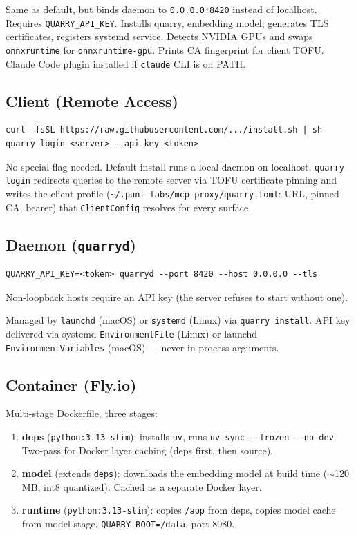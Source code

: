 \documentclass[a4paper,10pt]{article}
\begin{document}
Same as default, but binds daemon to \texttt{0.0.0.0:8420} instead of
localhost.  Requires \texttt{QUARRY\_API\_KEY}.  Installs quarry,
embedding model, generates TLS certificates, registers systemd service.
Detects NVIDIA GPUs and swaps \texttt{onnxruntime} for
\texttt{onnxruntime-gpu}.  Prints CA fingerprint for client TOFU.
Claude Code plugin installed if \texttt{claude} CLI is on PATH.

\subsection{Client (Remote Access)}

\begin{lstlisting}
curl -fsSL https://raw.githubusercontent.com/.../install.sh | sh
quarry login <server> --api-key <token>
\end{lstlisting}

No special flag needed.  Default install runs a local daemon on
localhost.  \texttt{quarry login} redirects queries to the remote
server via TOFU certificate pinning and writes the client profile
(\texttt{\~{}/.punt-labs/mcp-proxy/quarry.toml}: URL, pinned CA, bearer)
that \texttt{ClientConfig} resolves for every surface.

\subsection{Daemon (\texttt{quarryd})}

\begin{lstlisting}
QUARRY_API_KEY=<token> quarryd --port 8420 --host 0.0.0.0 --tls
\end{lstlisting}

Non-loopback hosts require an API key (the server refuses to start
without one).

Managed by \texttt{launchd} (macOS) or \texttt{systemd} (Linux) via
\texttt{quarry install}.  API key delivered via systemd
\texttt{EnvironmentFile} (Linux) or launchd
\texttt{EnvironmentVariables} (macOS) --- never in process arguments.

\subsection{Container (Fly.io)}

Multi-stage Dockerfile, three stages:

\begin{enumerate}
  \item \textbf{deps} (\texttt{python:3.13-slim}): installs
    \texttt{uv}, runs \texttt{uv sync -{}-frozen -{}-no-dev}.  Two-pass
    for Docker layer caching (deps first, then source).
  \item \textbf{model} (extends \texttt{deps}): downloads the
    embedding model at build time ($\sim$120\,MB, int8 quantized).
    Cached as a separate Docker layer.
  \item \textbf{runtime} (\texttt{python:3.13-slim}): copies
    \texttt{/app} from deps, copies model cache from model stage.
    \texttt{QUARRY\_ROOT=/data}, port 8080.
\end{enumerate}
\end{document}
